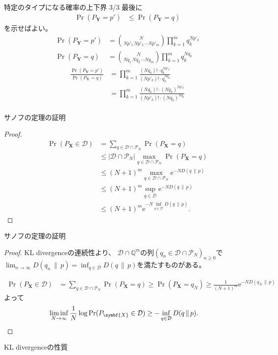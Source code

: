 \documentclass[lualatex,handout]{beamer}
\newcommand\KL[2]{D(#1\,\|\,#2)}
\theoremstyle{definition}
\begin{document}
\begin{frame}{特定のタイプになる確率の上下界 3/3}
\small
最後に
\begin{align*}
\Pr\left(P_{\symbf{Y}}= p'\right)&\le
\Pr\left(P_{\symbf{Y}}= q\right)
\end{align*}
を示せばよい。
\begin{align*}
\Pr(P_{\symbf{Y}}= p') &= \binom{N}{Np'_1\,Np'_2\,\dotsm Np'_m} \prod_{k=1}^m q_k^{Np'_k}\\
\Pr(P_{\symbf{Y}}= q) &= \binom{N}{Nq_1\,Nq_2\,\dotsm Nq_m} \prod_{k=1}^m q_k^{Nq_k}
\end{align*}
\begin{align*}
\frac{\Pr(P_{\symbf{Y}}= p')}{\Pr(P_{\symbf{Y}}= q)}&=\prod_{k=1}^m\frac{(Nq_k)!\cdot q_k^{Np'_k}}{(Np'_k)!\cdot q_k^{Nq_k}}\\
&=\prod_{k=1}^m\frac{(Nq_k)!\cdot (Nq_k)^{Np'_k}}{(Np'_k)!\cdot (Nq_k)^{Nq_k}}\\
\end{align*}
\end{frame}

\begin{frame}{サノフの定理の証明}
\footnotesize
\sanov
\begin{proof}
\vspace{-2em}
\begin{align*}
\Pr(P_{\symbf{X}}\in\mathcal{D}) &= \sum_{q\in\mathcal{D}\cap\mathcal{P}_N} \Pr(P_{\symbf{X}} = q)\\
 &\le |\mathcal{D}\cap\mathcal{P}_N| \max_{q\in\mathcal{D}\cap\mathcal{P}_N}\Pr(P_{\symbf{X}} = q)\\
 &\le (N+1)^m \max_{q\in\mathcal{D}\cap\mathcal{P}_N}\mathrm{e}^{-N\KL{q}{p}}\\
 &\le (N+1)^m \sup_{q\in\mathcal{D}}\mathrm{e}^{-N\KL{q}{p}}\\
 &\le (N+1)^m \mathrm{e}^{-N\inf_{q\in\mathcal{D}}\KL{q}{p}}.
\end{align*}
\end{proof}
\end{frame}

\begin{frame}{サノフの定理の証明}
\footnotesize
\sanov
\begin{proof}
KL divergenceの連続性より、
$\mathcal{D}\cap\mathbb{Q}^m$の列$(q_n\in\mathcal{D}\cap\mathcal{P}_N)_{n\ge 0}$で
$\lim_{n\to\infty} \KL{q_n}{p} = \inf_{q\in\mathcal{D}} \KL{q}{p}$を満たすものがある。

\begin{align*}
\Pr(P_{\symbf{X}}\in\mathcal{D}) &= \sum_{q\in\mathcal{D}\cap\mathcal{P}_N} \Pr(P_{\symbf{X}} = q)
 \ge \Pr(P_{\symbf{X}}=q_N)
 \ge \frac1{(N+1)^m}\mathrm{e}^{-N\KL{q_N}{p}}
\end{align*}
よって
\begin{align*}
\liminf_{N\to\infty}\frac1N
\log\Pr(P_{\symbf{X}}\in\mathcal{D}) &\ge -\inf_{q\in\mathcal{D}}\KL{q}{p}.\qedhere
\end{align*}
\end{proof}
\end{frame}

\begin{frame}{KL divergenceの性質}
\end{frame}
\end{document}
